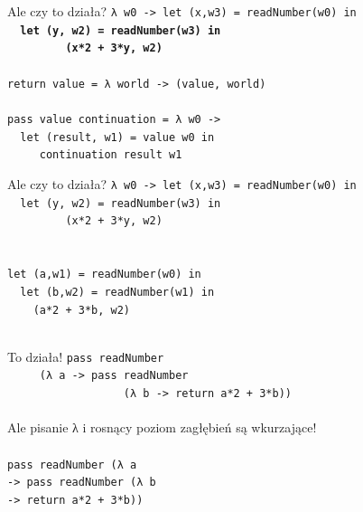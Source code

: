 \documentclass{beamer}
\begin{document}
\begin{frame}{Ale czy to działa?}
  \texttt{λ w0 -> let (x,w3) = readNumber(w0) in\\
    \ \ \textbf{let (y, w2) = readNumber(w3) in\\
      \ \ \ \ \ \ \ \ \ (x*2 + 3*y, w2)}\\
    \ \\
    return value = λ world -> (value, world) \\
    \ \\
    pass value continuation = λ w0 -> \\
    \ \ let (result, w1) = value w0 in \\
    \ \ \ \ \ continuation result w1
  }
\end{frame}

\begin{frame}{Ale czy to działa?}
  \texttt{λ w0 -> let (x,w3) = readNumber(w0) in\\
    \ \ let (y, w2) = readNumber(w3) in\\
      \ \ \ \ \ \ \ \ \ (x*2 + 3*y, w2)\\
    \ \\ \ \\
    let (a,w1) = readNumber(w0) in \\
    \ \ let (b,w2) = readNumber(w1) in \\
    \ \ \ \ (a*2 + 3*b, w2) \\
    \ 
  }
\end{frame}

\begin{frame}{To działa!}
  \texttt{pass readNumber \\
    \ \ \ \ \ (λ a -> pass readNumber \\
    \ \ \ \ \ \ \ \ \ \ \ \ \ \ \ \ \ \ (λ b -> return a*2 + 3*b))
  } \\ \ \\ \pause
  Ale pisanie λ i rosnący poziom zagłębień są wkurzające! \\ \pause
  \ \\
  \texttt{pass readNumber (λ a \\
    -> pass readNumber (λ b \\
    -> return a*2 + 3*b))
  } 
\end{frame}
\end{document}
